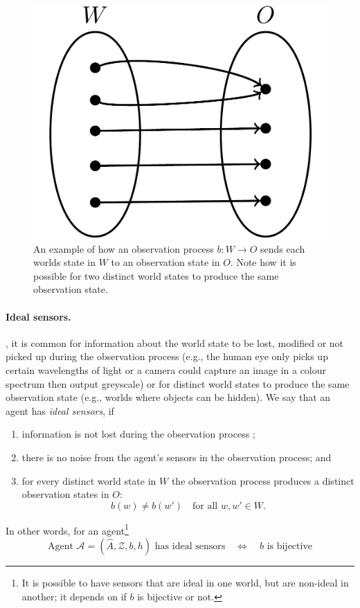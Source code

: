 \begin{figure}[H]
	\centering
	\includegraphics[width=0.5\linewidth]{2MathematicalFramework/Images/observation_process_W_to_O.png}
	\caption{
		An example of how an observation process $b: W \to O$ sends each worlds state in $W$ to an observation state in $O$.
		Note how it is possible for two distinct world states to produce the same observation state.
	}
	\label{fig:observation_process_W_to_O}
\end{figure}


\paragraph{Ideal sensors.}

, it is common for information about the world state to be lost, modified or not picked up during the observation process (e.g., the human eye only picks up certain wavelengths of light or a camera could capture an image in a colour spectrum then output greyscale) or for distinct world states to produce the same observation state (e.g., worlds where objects can be hidden).
We say that an agent has \emph{ideal sensors}, if
\begin{enumerate}
	\item information is not lost during the observation process ;
	\item there is no noise from the agent's sensors in the observation process; and
	\item for every distinct world state in $W$ the observation process produces a distinct observation states in $O$:
	\begin{equation}
		b(w) \neq b(w') \quad \text{for all $w,w' \in W$}.
	\end{equation}
\end{enumerate}
In other words, for an agent\footnote{
    It is possible to have sensors that are ideal in one world, but are non-ideal in another; it depends on if $b$ is bijective or not.
}
\begin{equation}
    \text{Agent $\mathscr{A} = (\hat{A}, \mathscr{Z}, b, h)$ has ideal sensors} \quad \iff \quad \text{$b$ is bijective}
\end{equation}

